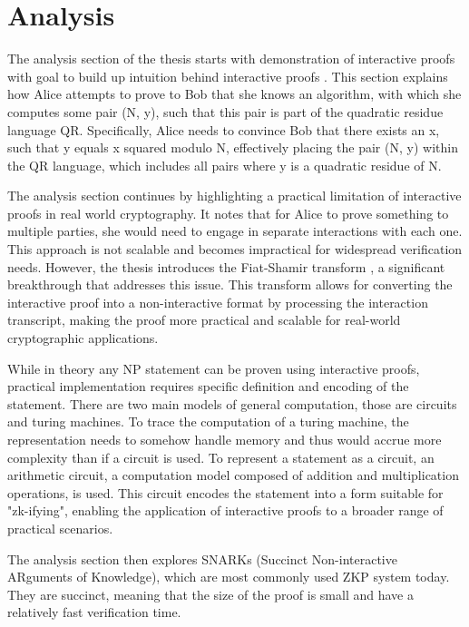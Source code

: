 \chapter{Analysis}

The analysis section of the thesis starts with demonstration of interactive
proofs with goal to build up intuition behind interactive proofs \cite{Goldwasser1989,youtubeMOOCLecture1}.
This section explains how Alice attempts to prove to Bob that she knows an
algorithm, with which she computes some pair (N, y), such that this pair is
part of the quadratic residue language QR. Specifically, Alice needs to
convince Bob that there exists an x, such that y equals x squared modulo N,
effectively placing the pair (N, y) within the QR language, which includes all
pairs where y is a quadratic residue of N.

The analysis section continues by highlighting a practical limitation of
interactive proofs in real world cryptography. It notes that for Alice to
prove something to multiple parties, she would need to engage in separate
interactions with each one. This approach is not scalable and becomes
impractical for widespread verification needs. However, the thesis introduces
the Fiat-Shamir transform \cite{Fiat}, a significant breakthrough that addresses this
issue. This transform allows for converting the interactive proof into a
non-interactive format by processing the interaction transcript, making the
proof more practical and scalable for real-world cryptographic applications.

While in theory any NP statement \cite{goldreich1991proofs} can be proven using
interactive proofs, practical implementation requires specific definition and
encoding of the statement. There are two main models of general computation,
those are circuits and turing machines. To trace the computation of a turing
machine, the representation needs to somehow handle memory and thus would accrue
more complexity than if a circuit is used. To represent a statement as a
circuit, an arithmetic circuit, a computation model composed of addition and
multiplication operations, is used. This circuit encodes the statement into a
form suitable for "zk-ifying", enabling the application of interactive proofs
to a broader range of practical scenarios.

The analysis section then explores SNARKs (Succinct Non-interactive ARguments
of Knowledge), which are most commonly used ZKP system today. They are succinct,
meaning that the size of the proof is small and have a relatively fast verification
time.

